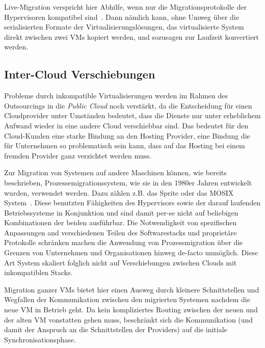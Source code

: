Live-Migration verspricht hier Abhilfe, wenn nur die
Migrationsprotokolle der Hypervisoren kompatibel
sind~\cite{none}. Dann nämlich kann, ohne Umweg über die
serialisierten Formate der Virtualisierungslösungen, das
virtualisierte System direkt zwischen zwei VMs kopiert werden, und
sozusagen zur Laufzeit konvertiert werden.

\subsection{Inter-Cloud Verschiebungen}
\label{sec:movclouds}
Probleme durch inkompatible Virtualisierungen werden im Rahmen des
Outsourcings in die \emph{Public Cloud} noch verstärkt, da die
Entscheidung für einen Cloudprovider unter Umständen bedeutet, dass
die Dienste nur unter erheblichem Aufwand wieder in eine andere Cloud
verschiebbar sind. Das bedeutet für den Cloud-Kunden eine starke
Bindung an den Hosting Provider, eine Bindung die für Unternehmen so
problematisch sein kann, dass auf das Hosting bei einem fremden
Provider ganz verzichtet werden muss.

Zur Migration von Systemen auf andere Maschinen können, wie bereits
beschrieben, Prozessemigrationssystem, wie sie in den 1980er Jahren
entwickelt wurden, verwendet werden. Dazu zählen z.B. das Sprite oder
das MOSIX System~\cite{hansen2004self}. Diese benutzten Fähigkeiten
des Hypervisors sowie der darauf laufenden Betriebssysteme in
Konjunktion und sind damit per-se nicht auf beliebigen Kombinationen
der beiden ausführbar. Die Notwendigkeit von spezifischen Anpassungen
and verschiedenen Teilen des Softwarestacks und proprietäre Protokolle
schränken machen die Anwendung von Prozessmigration über die Grenzen
von Unternehmen und Organisationen hinweg de-facto unmöglich. Diese
Art System skaliert folglich nicht auf Verschiebungen zwischen Clouds
mit inkompatiblen Stacks.

Migration ganzer VMs bietet hier einen Ausweg durch kleinere
Schnittstellen und Wegfallen der Kommunikation zwischen den migrierten
Systemen nachdem die neue VM in Betrieb geht. Da kein kompliziertes
Routing zwischen der neuen und der alten VM vonstatten gehen muss,
beschränkt sich die Kommunikation (und damit der Anspruch an die
Schnittstellen der Providers) auf die initiale Synchronisationsphase.

